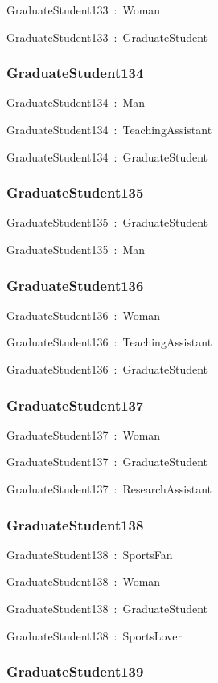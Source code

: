 \documentclass{article}
\begin{document}
GraduateStudent133~:~Woman

GraduateStudent133~:~GraduateStudent

\subsubsection*{GraduateStudent134}

GraduateStudent134~:~Man

GraduateStudent134~:~TeachingAssistant

GraduateStudent134~:~GraduateStudent

\subsubsection*{GraduateStudent135}

GraduateStudent135~:~GraduateStudent

GraduateStudent135~:~Man

\subsubsection*{GraduateStudent136}

GraduateStudent136~:~Woman

GraduateStudent136~:~TeachingAssistant

GraduateStudent136~:~GraduateStudent

\subsubsection*{GraduateStudent137}

GraduateStudent137~:~Woman

GraduateStudent137~:~GraduateStudent

GraduateStudent137~:~ResearchAssistant

\subsubsection*{GraduateStudent138}

GraduateStudent138~:~SportsFan

GraduateStudent138~:~Woman

GraduateStudent138~:~GraduateStudent

GraduateStudent138~:~SportsLover

\subsubsection*{GraduateStudent139}
\end{document}
